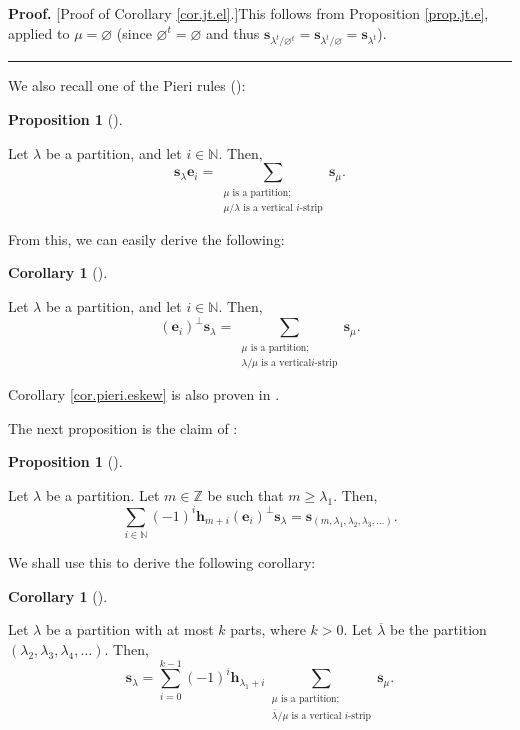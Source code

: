 \documentclass[numbers=enddot,12pt,final,onecolumn,notitlepage]{scrartcl}%
\theoremstyle{definition}
\newtheorem{prop}[theo]{Proposition}
\newenvironment{proposition}[1][]
{\begin{prop}[#1]\begin{leftbar}}
{\end{leftbar}\end{prop}}
\newtheorem{coro}[theo]{Corollary}
\newenvironment{corollary}[1][]
{\begin{coro}[#1]\begin{leftbar}}
{\end{leftbar}\end{coro}}
\newenvironment{proof}[1][Proof]{\noindent\textbf{#1.} }{\ \rule{0.5em}{0.5em}}
\let\sumnonlimits\sum
\renewcommand{\sum}{\sumnonlimits\limits}
\begin{document}
\begin{proof}
[Proof of Corollary \ref{cor.jt.el}.]This follows from Proposition
\ref{prop.jt.e}, applied to $\mu=\varnothing$ (since $\varnothing
^{t}=\varnothing$ and thus $\mathbf{s}_{\lambda^{t}/\varnothing^{t}%
}=\mathbf{s}_{\lambda^{t}/\varnothing}=\mathbf{s}_{\lambda^{t}}$).
\end{proof}

We also recall one of the Pieri rules (\cite[(2.7.2)]{GriRei18}):

\begin{proposition}
\label{prop.pieri.e}Let $\lambda$ be a partition, and let $i\in\mathbb{N}$.
Then,%
\[
\mathbf{s}_{\lambda}\mathbf{e}_{i}=\sum_{\substack{\mu\text{ is a
partition;}\\\mu/\lambda\text{ is a vertical }i\text{-strip}}}\mathbf{s}_{\mu
}.
\]

\end{proposition}

From this, we can easily derive the following:

\begin{corollary}
\label{cor.pieri.eskew}Let $\lambda$ be a partition, and let $i\in\mathbb{N}$.
Then,%
\[
\left(  \mathbf{e}_{i}\right)  ^{\perp}\mathbf{s}_{\lambda}=\sum
_{\substack{\mu\text{ is a partition;}\\\lambda/\mu\text{ is a vertical
}i\text{-strip}}}\mathbf{s}_{\mu}.
\]

\end{corollary}

Corollary \ref{cor.pieri.eskew} is also proven in \cite[(2.8.4)]{GriRei18}.

The next proposition is the claim of \cite[Exercise 2.9.1(b)]{GriRei18}:

\begin{proposition}
\label{prop.bernstein.1}Let $\lambda$ be a partition. Let $m\in\mathbb{Z}$ be
such that $m\geq\lambda_{1}$. Then,%
\[
\sum_{i\in\mathbb{N}}\left(  -1\right)  ^{i}\mathbf{h}_{m+i} \left(
\mathbf{e}_{i}\right)  ^{\perp}\mathbf{s}_{\lambda}=\mathbf{s}_{\left(
m,\lambda_{1},\lambda_{2},\lambda_{3},\ldots\right)  }.
\]

\end{proposition}

We shall use this to derive the following corollary:

\begin{corollary}
\label{cor.bernstein.2}Let $\lambda$ be a partition with at most $k$ parts,
where $k>0$. Let $\overline{\lambda}$ be the partition $\left(  \lambda
_{2},\lambda_{3},\lambda_{4},\ldots\right)  $. Then,%
\[
\mathbf{s}_{\lambda}=\sum_{i=0}^{k-1}\left(  -1\right)  ^{i}\mathbf{h}%
_{\lambda_{1}+i}\sum_{\substack{\mu\text{ is a partition;}\\\overline{\lambda
}/\mu\text{ is a vertical }i\text{-strip}}}\mathbf{s}_{\mu}.
\]

\end{corollary}
\end{document}
